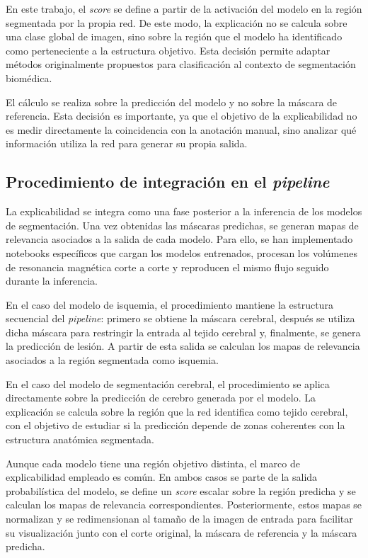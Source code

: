 En este trabajo, el \textit{score} se define a partir de la activación del modelo en la región segmentada por la propia red. De este modo, la explicación no se calcula sobre una clase global de imagen, sino sobre la región que el modelo ha identificado como perteneciente a la estructura objetivo. Esta decisión permite adaptar métodos originalmente propuestos para clasificación al contexto de segmentación biomédica.

El cálculo se realiza sobre la predicción del modelo y no sobre la máscara de referencia. Esta decisión es importante, ya que el objetivo de la explicabilidad no es medir directamente la coincidencia con la anotación manual, sino analizar qué información utiliza la red para generar su propia salida.

\subsection{Procedimiento de integración en el \textit{pipeline}}

La explicabilidad se integra como una fase posterior a la inferencia de los modelos de segmentación. Una vez obtenidas las máscaras predichas, se generan mapas de relevancia asociados a la salida de cada modelo. Para ello, se han implementado notebooks específicos que cargan los modelos entrenados, procesan los volúmenes de resonancia magnética corte a corte y reproducen el mismo flujo seguido durante la inferencia.

En el caso del modelo de isquemia, el procedimiento mantiene la estructura secuencial del \textit{pipeline}: primero se obtiene la máscara cerebral, después se utiliza dicha máscara para restringir la entrada al tejido cerebral y, finalmente, se genera la predicción de lesión. A partir de esta salida se calculan los mapas de relevancia asociados a la región segmentada como isquemia.

En el caso del modelo de segmentación cerebral, el procedimiento se aplica directamente sobre la predicción de cerebro generada por el modelo. La explicación se calcula sobre la región que la red identifica como tejido cerebral, con el objetivo de estudiar si la predicción depende de zonas coherentes con la estructura anatómica segmentada.

Aunque cada modelo tiene una región objetivo distinta, el marco de explicabilidad empleado es común. En ambos casos se parte de la salida probabilística del modelo, se define un \textit{score} escalar sobre la región predicha y se calculan los mapas de relevancia correspondientes. Posteriormente, estos mapas se normalizan y se redimensionan al tamaño de la imagen de entrada para facilitar su visualización junto con el corte original, la máscara de referencia y la máscara predicha.

